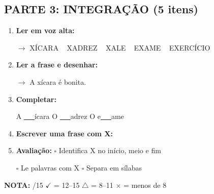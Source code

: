 \begin{exercicio}
\subsection*{PARTE 3: INTEGRAÇÃO (5 itens)}

\begin{enumerate}[resume]
  \item \textbf{Ler em voz alta:}
  \begin{center}
  $\rightarrow$ XÍCARA  ~  XADREZ  ~  XALE  ~  EXAME  ~  EXERCÍCIO
  \end{center}

  \item \textbf{Ler a frase e desenhar:}
  \begin{center}
  $\rightarrow$ A xícara é bonita.
  \end{center}
  \begin{center}
  \end{center}

  \item \textbf{Completar:}
  \begin{center}
  A \underline{~~~}ícara \quad O \underline{~~~}adrez \quad O e\underline{~~~}ame
  \end{center}

  \item \textbf{Escrever uma frase com X:}
  \begin{center}
  \underline{\hspace{12cm}}
  \end{center}

  \item \textbf{Avaliação:} $\square$ Identifica X no início, meio e fim
  \begin{center}
  $\square$ Le palavras com X \quad $\square$ Separa em sílabas
  \end{center}
\end{enumerate}

\noindent\textbf{NOTA:} \underline{\hspace{1cm}}/15 \quad $\checkmark$ = 12--15 \quad $\triangle$ = 8--11 \quad $\times$ = menos de 8
\end{exercicio}

